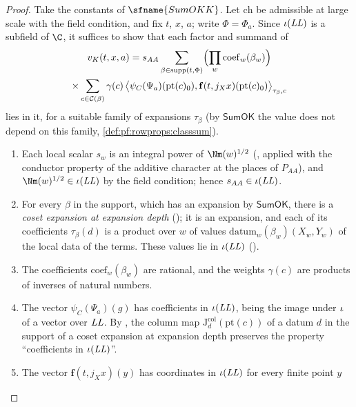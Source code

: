 \begin{proof}
Take the constants of $\sfname{SumOKK}$. Let $\mathrm{ch}$ be admissible at large scale with the field condition, and
fix $t$, $x$, $a$; write $\Phi=\Phi_a$. Since $\iota(\mathit{LL})$ is a subfield of $\C$, it suffices to show that
each factor and summand of
\begin{multline*}
v_K(t,x,a)=s_{AA}\sum_{\beta\in\mathrm{supp}(t,\Phi)}\Bigl(\prod_w\mathrm{coef}_w(\beta_w)\Bigr)\\
\times\sum_{c\in\mathcal C(\beta)}\gamma(c)\,\bigl\langle\psi_C(\Psi_a)(\mathrm{pt}(c)_0),\mathbf{f}(t,j_Xx)(\mathrm{pt}(c)_0)\bigr\rangle_{\tau_\beta,c}
\end{multline*}
lies in it, for a suitable family of expansions $\tau_\beta$ (by $\mathsf{SumOK}$ the value does not depend on this family,
\cref{def:pf:rowprops:classsum}).
\begin{enumerate}[label=(\arabic*)]
\item Each local scalar $s_w$ is an integral power of $\Nm(w)^{1/2}$ (, applied
with the conductor property of the additive character at the places of $P_{AA}$), and $\Nm(w)^{1/2}\in\rowpropsemb(\rowpropsLL)$
by the field condition; hence $s_{AA}\in\iota(\mathit{LL})$.
\item For every $\beta$ in the support, which has an expansion by $\mathsf{SumOK}$, there is a \emph{coset expansion at
expansion depth} (); it is an expansion, and each of its
coefficients $\tau_\beta(d)$ is a product over $w$ of values $\mathrm{datum}_w(\beta_w)(X_w,Y_w)$ of the local data of the
terms. These values lie in $\iota(\mathit{LL})$ ().
\item The coefficients $\mathrm{coef}_w(\beta_w)$ are rational, and the weights $\gamma(c)$ are products of inverses of
natural numbers.
\item The vector $\psi_C(\Psi_a)(g)$ has coefficients in $\iota(\mathit{LL})$, being the image under $\iota$ of
a vector over $\mathit{LL}$. By , the column map
$\mathrm{J}^{\mathrm{col}}_d(\mathrm{pt}(c))$ of a datum $d$ in the support of a coset expansion at expansion depth preserves the
property ``coefficients in $\iota(\mathit{LL})$''.
\item The vector $\mathbf{f}(t,j_Xx)(y)$ has coordinates in $\iota(\mathit{LL})$ for every finite point $y$

\end{enumerate}
\end{proof}
